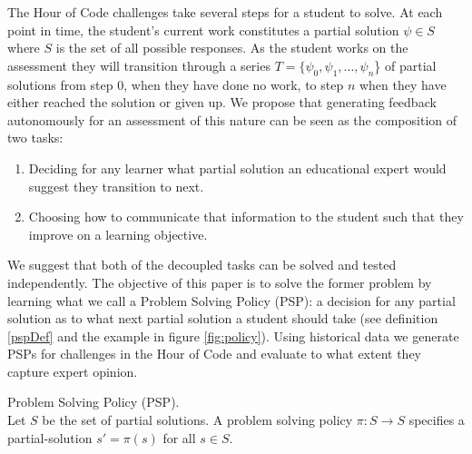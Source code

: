 The Hour of Code challenges take several steps for a student to solve. At each point in time, the student's current work constitutes a partial solution $\psi \in S$ where $S$ is the set of all possible responses. As the student works on the assessment they will transition through a series $T = \{\psi_0, \psi_1, ... , \psi_n$\} of partial solutions from step $0$, when they have done no work, to step $n$ when they have either reached the solution or given up. 
We propose that generating feedback autonomously for an assessment of this nature can be seen as the composition of two tasks: 
\begin{enumerate}
\item Deciding for any learner what partial solution an educational expert would suggest they transition to next. 
\item Choosing how to communicate that information to the student such that they improve on a learning objective. 
\end{enumerate}
We suggest that both of the decoupled tasks can be solved and tested independently. The objective of this paper is to solve the former problem by learning what we call a Problem Solving Policy (PSP): a decision for any partial solution as to what next partial solution a student should take (see definition \ref{pspDef} and the example in figure \ref{fig:policy}). Using historical data we generate PSPs for challenges in the Hour of Code and evaluate to what extent they capture expert opinion.

\begin{defo}
Problem Solving Policy (PSP). \\ 
Let $S$ be the set of partial solutions.
A problem solving policy $\pi : S \rightarrow S$ specifies a partial-solution $s' = \pi(s)$ for all $s \in S$.
\label{pspDef}
\end{defo}

